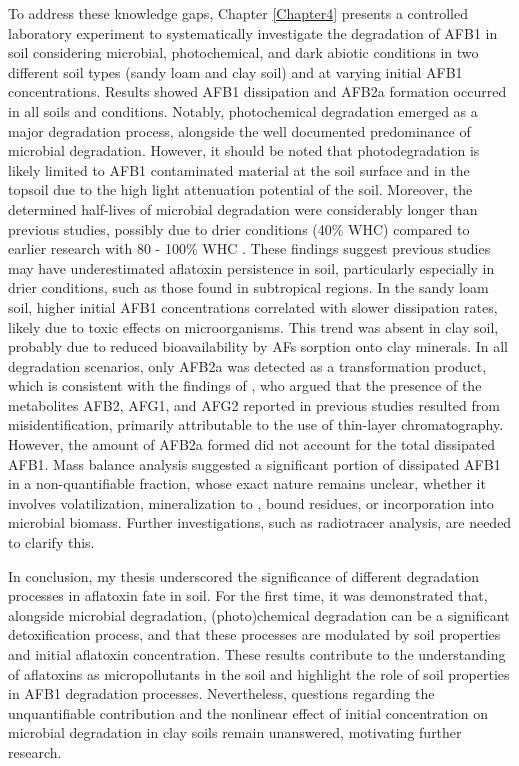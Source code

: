 To address these knowledge gaps, Chapter \ref{Chapter4} presents a controlled laboratory experiment to systematically investigate the degradation of AFB1 in soil considering microbial, photochemical, and dark abiotic conditions in two different soil types (sandy loam and clay soil) and at varying initial AFB1 concentrations. Results showed AFB1 dissipation and AFB2a formation occurred in all soils and conditions. Notably, photochemical degradation emerged as a major degradation process, alongside the well documented predominance of microbial degradation. However, it should be noted that photodegradation is likely limited to AFB1 contaminated material at the soil surface and in the topsoil due to the high light attenuation potential of the soil. Moreover, the determined half-lives of microbial degradation were considerably longer than previous studies, possibly due to drier conditions (40\% WHC) compared to earlier research with 80 - 100\% WHC \citep{accinelli2008aspergillus, angle1980decomposition, angle1986aflatoxin}. These findings suggest previous studies may have underestimated aflatoxin persistence in soil, particularly especially in drier conditions, such as those found in subtropical regions. In the sandy loam soil, higher initial AFB1 concentrations correlated with slower dissipation rates, likely due to toxic effects on microorganisms. This trend was absent in clay soil, probably due to reduced bioavailability by AFs sorption onto clay minerals. In all degradation scenarios, only AFB2a was detected as a transformation product, which is consistent with the findings of \citet{starr2017solvent}, who argued that the presence of the metabolites AFB2, AFG1, and AFG2 reported in previous studies \citep{angle1980decomposition, angle1986aflatoxin} resulted from misidentification, primarily attributable to the use of thin-layer chromatography. However, the amount of AFB2a formed did not account for the total dissipated AFB1. Mass balance analysis suggested a significant portion of dissipated AFB1 in a non-quantifiable fraction, whose exact nature remains unclear, whether it involves volatilization, mineralization to , bound residues, or incorporation into microbial biomass. Further investigations, such as radiotracer analysis, are needed to clarify this. 


In conclusion, my thesis underscored the significance of different degradation processes in aflatoxin fate in soil. For the first time, it was demonstrated that, alongside microbial degradation, (photo)chemical degradation can be a significant detoxification process, and that these processes are modulated by soil properties and initial aflatoxin concentration. These results contribute to the understanding of aflatoxins as micropollutants in the soil and highlight the role of soil properties in AFB1 degradation processes. Nevertheless, questions regarding the unquantifiable contribution and the nonlinear effect of initial concentration on microbial degradation in clay soils remain unanswered, motivating further research.

